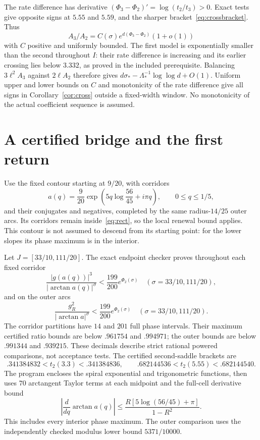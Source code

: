 \documentclass[11pt,a4paper]{article}
\begin{document}
The rate difference has derivative
$(\Phi_3-\Phi_2)'=\log(t_2/t_3)>0$.
Exact tests give opposite signs at $5.55$ and $5.59$, and the sharper bracket~\eqref{eq:crossbracket}. Thus
\[
 A_3/A_2=C(\sigma)e^{d(\Phi_3-\Phi_2)}(1+o(1))
\]
with $C$ positive and uniformly bounded. The first model is exponentially smaller than the second throughout $I$: their rate difference is increasing and its earlier crossing lies below $3.332$, as proved in the included prerequisite.
Balancing $3\ell^2A_3$ against $2\ell A_2$ therefore gives
$d\sigma_*-\Lambda_*^{-1}\log\log d+O(1)$. Uniform upper and lower bounds on $C$ and monotonicity of the rate difference give all signs in Corollary~\ref{cor:cross} outside a fixed-width window. No monotonicity of the actual coefficient sequence is assumed.

\section{A certified bridge and the first return}\label{sec:bridge}
Use the fixed contour starting at $9/20$, with corridors
\[
 a(q)=\frac9{20}\exp\!\left(5q\log\frac{56}{45}+i\pi q\right),
 \qquad 0\le q\le1/5,
\]
and their conjugates and negatives, completed by the same radius-$14/25$ outer arcs. Its corridors remain inside~\eqref{eq:rect}, so the local renewal bound applies. This contour is not assumed to descend from its starting point: for the lower slopes its phase maximum is in the interior.

Let $J=[33/10,111/20]$. The exact endpoint checker proves throughout each fixed corridor
\begin{equation}\label{eq:bridgecorr}
 \frac{|g(a(q))|^3}{|\arctan a(q)|^\sigma}
 <\frac{199}{200}e^{\Phi_2(\sigma)}
 \quad(\sigma=33/10,111/20),
\end{equation}
and on the outer arcs
\begin{equation}\label{eq:bridgeouter}
 \frac{g_R^2}{|\arctan a|^\sigma}
 <\frac{199}{200}e^{\Phi_2(\sigma)}
 \quad(\sigma=33/10,111/20).
\end{equation}
The corridor partitions have $14$ and $201$ full phase intervals. Their maximum certified ratio bounds are below $.961754$ and $.994971$; the outer bounds are below $.991344$ and $.939215$. These decimals describe strict rational powered comparisons, not acceptance tests. The certified second-saddle brackets are
\[
 .341384832<t_2(3.3)<.341384836,\qquad
 .682144536<t_2(5.55)<.682144540.
\]
The program encloses the spiral exponential and trigonometric functions, then uses $70$ arctangent Taylor terms at each midpoint and the full-cell derivative bound
\[
 \left|\frac{d}{dq}\arctan a(q)\right|
 \le\frac{R[5\log(56/45)+\pi]}{1-R^2}.
\]
This includes every interior phase maximum. The outer comparison uses the independently checked modulus lower bound $5371/10000$.
\end{document}
